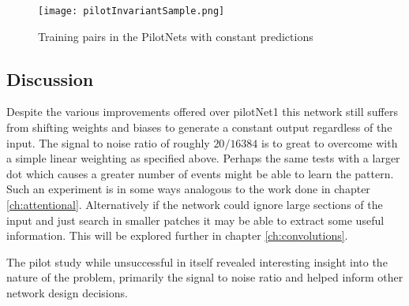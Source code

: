 \begin{figure}[h]
    \centering
    \texttt{[image: pilotInvariantSample.png]}
    \caption{Training pairs in the PilotNets with constant predictions}
    \label{fig:pilotInvarianceSample}
\end{figure}


\subsection{Discussion}
Despite the various improvements offered over pilotNet1 this network still suffers from shifting weights and biases to generate a constant output regardless of the input. 
The signal to noise ratio of roughly $20/16384$ is to great to overcome with a simple linear weighting as specified above.
Perhaps the same tests with a larger dot which causes a greater number of events might be able to learn the pattern. 
Such an experiment is in some ways analogous to the work done in chapter \ref{ch:attentional}. 
Alternatively if the network could ignore large sections of the input and just search in smaller patches it may be able to extract some useful information.
This will be explored further in chapter \ref{ch:convolutions}. 

The pilot study while unsuccessful in itself revealed interesting insight into the nature of the problem, primarily the signal to noise ratio and helped inform other network design decisions.
 
